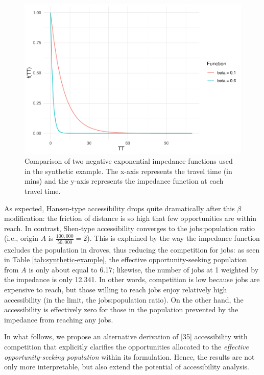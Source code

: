 \documentclass[10pt,letterpaper]{article}
\begin{document}
\begin{figure}
\includegraphics[width=1\linewidth]{Spatial-Availability-Paper_files/figure-latex/comparison-impedance-functions-synthetic-example-1} \caption{\label{fig:impedance-functions-comparison}Comparison of two negative exponential impedance functions used in the synthetic example. The x-axis represents the travel time (in mins) and the y-axis represents the impedance function at each travel time.}\label{fig:comparison-impedance-functions-synthetic-example}
\end{figure}

As expected, Hansen-type accessibility drops quite dramatically after
this \(\beta\) modification: the friction of distance is so high that
few opportunities are within reach. In contrast, Shen-type accessibility
converges to the jobs:population ratio (i.e., origin \(A\) is
\(\frac{100,000}{50,000} = 2\)). This is explained by the way the
impedance function excludes the population in droves, thus reducing the
competition for jobs: as seen in Table \ref{tab:synthetic-example}, the
effective opportunity-seeking population from \(A\) is only about equal
to 6.17; likewise, the number of jobs at 1 weighted by the impedance is
only 12.341. In other words, competition is low because jobs are
expensive to reach, but those willing to reach jobs enjoy relatively
high accessibility (in the limit, the jobs:population ratio). On the
other hand, the accessibility is effectively zero for those in the
population prevented by the impedance from reaching any jobs.

In what follows, we propose an alternative derivation of {[}35{]}
accessibility with competition that explicitly clarifies the
opportunities allocated to the \emph{effective opportunity-seeking
population} within its formulation. Hence, the results are not only more
interpretable, but also extend the potential of accessibility analysis.
\end{document}
